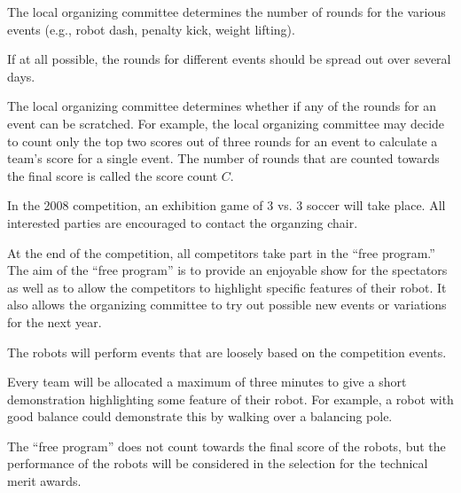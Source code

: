 \documentclass[12pt]{hurocup}
\begin{document}
\begin{lawlist}[ORG]
  
\item The local organizing committee determines the number of rounds
 for the various events (e.g., robot dash, penalty kick, weight lifting).
  
\item If at all possible, the rounds for different events should be spread out  over several days.
 
\item The local organizing committee determines whether if any of the rounds 
 for an event can be scratched. For example, the local organizing
 committee may decide to count only the top two scores out of three
 rounds for an event to calculate a team's score for a single
 event. The number of rounds that are counted towards the final score
 is called the score count $C$.

\end{lawlist}

\begin{decisions}
\item In the 2008 competition, an exhibition game of 3 vs. 3 soccer
will take place. All interested parties are encouraged to contact the
organzing chair.
\end{decisions}


\begin{lawlist}[ORG]
  
\item At the end of the competition, all competitors take part in the
 ``free program.'' The aim of the ``free program'' is to provide an
 enjoyable show for the spectators as well as to allow the competitors
 to highlight specific features of their robot. It also allows the
 organizing committee to try out possible new events or variations for
 the next year.
  
\item The robots will perform events that are loosely based on the
 competition events. 
  
\item Every team will be allocated a maximum of three minutes to give
 a short demonstration highlighting some feature of their robot. For
 example, a robot with good balance could demonstrate this by walking
 over a balancing pole.
  
\item The ``free program'' does not count towards the final score of
 the robots, but the performance of the robots will be considered in
 the selection for the technical merit awards.

\end{lawlist}
\end{document}
